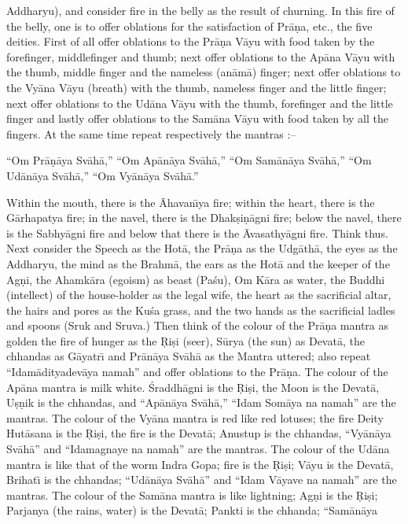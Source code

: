 Addharyu), and consider fire in the belly as the result of churning. In this fire of the belly, one is to offer oblations for the satisfaction of Pr\=a\d{n}a, etc., the five deities. First of all offer oblations to the Pr\=a\d{n}a V\=ayu with food taken by the forefinger, middlefinger and thumb; next offer oblations to the Ap\=ana V\=ayu with the thumb, middle finger and the nameless (an\=am\=a) finger; next offer oblations to the Vy\=ana V\=ayu (breath) with the thumb, nameless finger and the little finger; next offer oblations to the Ud\=ana V\=ayu with the thumb, forefinger and the little finger and lastly offer oblations to the Sam\=ana V\=ayu with food taken by all the fingers. At the same time repeat respectively the mantras :--

``Om Pr\=a\d{n}\=aya Sv\=ah\=a,''
``Om Ap\=an\=aya Sv\=ah\=a,''
``Om Sam\=an\=aya Sv\=ah\=a,''
``Om Ud\=an\=aya Sv\=ah\=a,''
``Om Vy\=an\=aya Sv\=ah\=a.''

Within the mouth, there is the \=Ahavan\={\i}ya fire; within the heart, there is the G\=arhapatya fire; in the navel, there is the Dhak\d{s}i\d{n}\=agni fire; below the navel, there is the Sabhy\=agni fire and below that there is the \=Avasathy\=agni fire. Think thus. Next consider the Speech as the Hot\=a, the Pr\=a\d{n}a as the Udg\=ath\=a, the eyes as the Addharyu, the mind as the Brahm\=a, the ears as the Hot\=a and the keeper of the Ag\d{n}i, the Ahamk\=ara (egoism) as beast (Pa\'su), Om K\=ara as water, the Buddhi (intellect) of the house-holder as the legal wife, the heart as the sacrificial altar, the hairs and pores as the Ku\'sa grass, and the two hands as the sacrificial ladles and spoons (Sruk and Sruva.) Then think of the colour of the Pr\=a\d{n}a mantra as golden the fire of hunger as the \d{R}i\d{s}i (seer), S\=urya (the sun) as Devat\=a, the chhandas as G\=ayatr\={\i} and Pr\=an\=aya Sv\=ah\=a as the Mantra uttered; also repeat ``Idam\=adityadev\=aya namah'' and offer oblations to the Pr\=a\d{n}a. The colour of the Ap\=ana mantra is milk white. \'Sraddh\=agni is the \d{R}i\d{s}i, the Moon is the Devat\=a, U\d{s}\d{n}ik is the chhandas, and ``Ap\=an\=aya Sv\=ah\=a,'' ``Idam Som\=aya na namah'' are the mantras. The colour of the Vy\=ana mantra is red like red lotuses; the fire Deity Hut\=asana is the \d{R}i\d{s}i, the fire is the Devat\=a; Anustup is the chhandas, ``Vy\=an\=aya Sv\=ah\=a'' and ``Idamagnaye na namah'' are the mantras. The colour of the Ud\=ana mantra is like that of the worm Indra Gopa; fire is the \d{R}i\d{s}i; V\=ayu is the Devat\=a, Brihat\={\i} is the chhandas; ``Ud\=an\=aya Sv\=ah\=a'' and ``Idam V\=ayave na namah'' are the mantras. The colour of the Sam\=ana mantra is like lightning; Ag\d{n}i is the \d{R}i\d{s}i; Parjanya (the rains, water) is the Devat\=a; Pankti is the chhanda; ``Sam\=an\=aya

